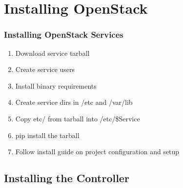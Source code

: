 \documentclass[aspectratio=169,11pt,hyperref={colorlinks=true}]{beamer}
\begin{document}
\section{Installing OpenStack}
\begin{frame}
    \frametitle{Installing OpenStack Services}
    \begin{enumerate}
        \item Download service tarball
        \item Create service users
        \item Install binary requirements
        \item Create service dirs in /etc and /var/lib
        \item Copy etc/ from tarball into /etc/\$Service
        \item pip install the tarball
        \item Follow install guide on project configuration and setup
    \end{enumerate}
\end{frame}

\subsection{Installing the Controller}
\end{document}
